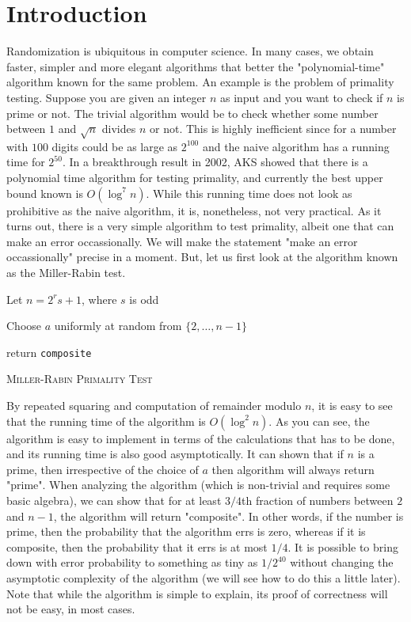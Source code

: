 \chapter{Introduction}

Randomization is ubiquitous in computer science. In many cases, we obtain
faster, simpler and more elegant algorithms that better the "polynomial-time"
algorithm known for the same problem. An example is the problem of primality
testing. Suppose you are given an integer $n$ as input and you want to check if
$n$ is prime or not. The trivial algorithm would be to check whether some number
between $1$ and $\sqrt{n}$ divides $n$ or not. This is highly inefficient since
for a number with $100$ digits could be as large as $2^{100}$ and the naive
algorithm has a running time for $2^{50}$. In a breakthrough result in 2002, AKS
showed that there is a polynomial time algorithm for testing primality, and
currently the best upper bound known is $O(\log^7 n)$. While this running time
does not look as prohibitive as the naive algorithm, it is, nonetheless, not
very practical. As it turns out, there is a very simple algorithm to test
primality, albeit one that can make an error occassionally. We will make the
statement "make an error occassionally" precise in a moment. But, let us first
look at the algorithm known as the Miller-Rabin test.

\begin{algorithm}
	\BlankLine
	
	Let $n = 2^rs+1$, where $s$ is odd
	
	Choose $a$ uniformly at random from $\{2, \ldots, n-1\}$
	
	

	return \texttt{composite}
	\caption{\textsc{Miller-Rabin Primality Test}}
	\label{alg:primality}
\end{algorithm}

By repeated squaring and computation of remainder modulo $n$, it is easy to see
that the running time of the algorithm is $O(\log^2 n)$. As you can see, the
algorithm is easy to implement in terms of the calculations that has to be done,
and its running time is also good asymptotically. It can shown that if $n$ is a
prime, then irrespective of the choice of $a$ then algorithm will always return
"prime". When analyzing the algorithm (which is non-trivial and requires some
basic algebra), we can show that for at least $3/4$th fraction of numbers
between $2$ and $n-1$, the algorithm will return "composite". In other words, if
the number is prime, then the probability that the algorithm errs is zero,
whereas if it is composite, then the probability that it errs is at most
$1/4$. It is possible to bring down with error probability to something as tiny
as $1/2^{40}$ without changing the asymptotic complexity of the algorithm (we
will see how to do this a little later). Note that while the algorithm is simple
to explain, its proof of correctness will not be easy, in most cases.

